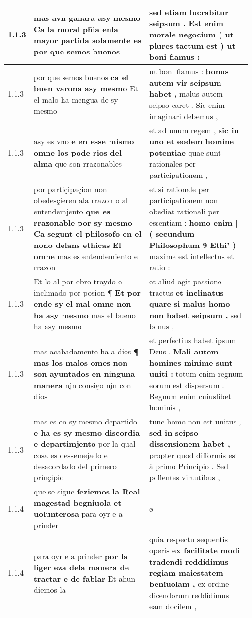 \begin{tabular}{|p{1cm}|p{6.5cm}|p{6.5cm}|}
1.1.3 & mas avn ganara asy mesmo \textbf{ Ca la moral ph̃ia enla mayor partida solamente es } por que semos buenos & sed etiam lucrabitur seipsum . Est enim morale negocium \textbf{ ( ut plures tactum est ) } ut boni fiamus : \\\hline
1.1.3 & por que semos buenos \textbf{ ca el buen varona asy mesmo } Et el malo ha mengua de sy mesmo & ut boni fiamus : \textbf{ bonus autem vir seipsum habet , } malus autem seipso caret . Sic enim imaginari debemus , \\\hline
1.1.3 & asy es vno \textbf{ e en esse mismo omne los pode rios del alma } que son rrazonables & et ad unum regem , \textbf{ sic in uno et eodem homine potentiae } quae sunt rationales per participationem , \\\hline
1.1.3 & por partiçipaçion non obedesçieren ala rrazon o al entendemjento \textbf{ que es rrazonable por sy mesmo Ca segunt el philosofo en el nono delans ethicas El omne } mas es entendemiento e rrazon & et si rationale per participationem non obediat rationali per essentiam : \textbf{ homo enim | ( secundum Philosophum 9 Ethi’ ) } maxime est intellectus et ratio : \\\hline
1.1.3 & Et lo al por obro traydo e inclimado por posion ¶ \textbf{ Et por ende sy el mal omne non ha asy mesmo } mas el bueno ha asy mesmo & et aliud agit passione tractus \textbf{ et inclinatus quare si malus homo non habet seipsum , } sed bonus , \\\hline
1.1.3 & mas acabadamente ha a dios ¶ \textbf{ mas los malos omes non son ayuntados en ninguna manera } njn consigo njn con dios & et perfectius habet ipsum Deus . \textbf{ Mali autem homines minime sunt uniti : } totum enim regnum eorum est dispersum . Regnum enim cuiuslibet hominis , \\\hline
1.1.3 & mas es en sy mesmo departido \textbf{ e ha es sy mesmo discordia e departimjento } por la qual cosa es dessemejado e desacordado del primero prinçipio & tunc homo non est unitus , \textbf{ sed in seipso dissensionem habet , } propter quod difformis est à primo Principio . Sed pollentes virtutibus , \\\hline
1.1.4 & que se sigue \textbf{ feziemos la Real magestad begniuola et uolunterosa } para oyr e a prinder & ø \\\hline
1.1.4 & para oyr e a prinder \textbf{ por la liger eza dela manera de tractar e de fablar } Et ahun diemos la & quia respectu sequentis operis \textbf{ ex facilitate modi tradendi reddidimus regiam maiestatem beniuolam , } ex ordine dicendorum reddidimus eam docilem , \\\hline

\end{tabular}
